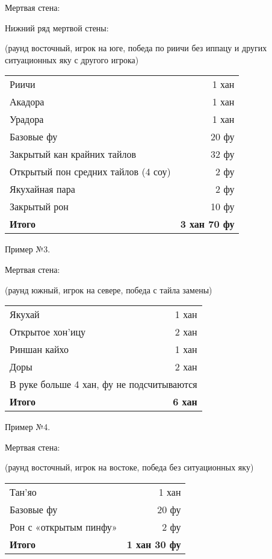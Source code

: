 Мертвая стена: 

Нижний ряд мертвой стены: 

(раунд восточный, игрок на юге, победа по риичи без иппацу и других ситуационных яку с другого игрока)

\begin{tabular}{lr}
	Риичи & 1 хан \\
	Акадора & 1 хан \\
	Урадора & 1 хан \\
	Базовые фу & 20 фу \\
	Закрытый кан крайних тайлов & 32 фу \\
	Открытый пон средних тайлов (4 соу) & 2 фу \\
	Якухайная пара & 2 фу \\
	Закрытый рон & 10 фу \\
	\hline
	\textbf{Итого} & \textbf{3 хан 70 фу} \\
\end{tabular}

Пример №3. 


Мертвая стена: 

(раунд южный, игрок на севере, победа с тайла замены)

\begin{tabular}{lr}
	Якухай & 1 хан \\
	Открытое хон'ицу & 2 хан \\
	Риншан кайхо & 1 хан \\
	Доры & 2 хан \\
	\multicolumn{2}{l}{В руке больше 4 хан, фу не подсчитываются} \\
	\hline
	\textbf{Итого} & \textbf{6 хан} \\
\end{tabular}

Пример №4.

 \hfill {}

Мертвая стена: 

(раунд восточный, игрок на востоке, победа без ситуационных яку)

\begin{tabular}{lr}
	Тан'яо & 1 хан \\
	Базовые фу & 20 фу \\
	Рон с «открытым пинфу» & 2 фу \\
	\hline
	\textbf{Итого} & \textbf{1 хан 30 фу} \\
\end{tabular}

